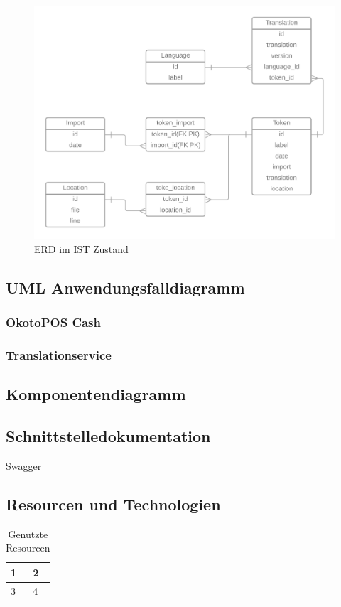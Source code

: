 \documentclass[10pt, oneside]{article}
\begin{document}
  \begin{figure}[ht]
    \label{abb:erdIs1}
    \centering
    \includegraphics[width=\textwidth]{ERD_TranslationService_IST-Analyse.png}
    \caption{ERD im IST Zustand}
  \end{figure}
  \newpage
  \subsection{UML Anwendungsfalldiagramm}\label{sec:uml:aw:new}
  \subsubsection{OkotoPOS Cash}\label{sec:uml:aw:cash}
  \subsubsection{Translationservice}\label{sec:uml:aw:ts}
  \subsection{Komponentendiagramm}\label{sec:uml:komponenten}
  \subsection{Schnittstelledokumentation}
    \label{sec:swa:ts}
  Swagger
  \subsection{Resourcen und Technologien}\label{sec:resources}
    \begin{table}[ht]
      \centering
      \begin{tabular}{| l | l |}
        1 & 2 \\
        \hline
        3 & 4\\
        \hline
      \end{tabular}
      \caption{Genutzte Resourcen}
    \end{table}
\end{document}
